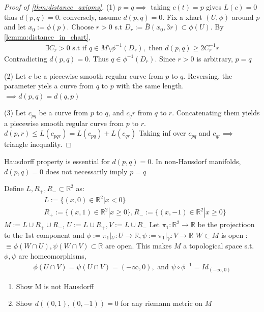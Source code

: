 \begin{proof}[Proof of \autoref{thm:distance_axioms}]
    (1) $p=q \implies$ taking $c(t) = p$ gives $L(c) = 0 $ thus $d(p,q) =0$.
    conversely, assume $d(p,q) = 0$.
    Fix a xhart $(U, \phi)$ around $p$ and let $x_0 := \phi(p)$. 
    Choose $r>0$ s.t $D_r := \bar{B}(x_0, 3r) \subset \phi(U)$. By \autoref{lemma:distance_in_chart}, 
    \[
    \begin{aligned}
        \exists C_r > 0 \text{ s.t if } q \in M \setminus \phi^{-1} (D_r), \text{ then } d(p,q) \geq 2C_r^{-1} r
    \end{aligned}
    \]
    Contradicting $d(p,q) = 0$. Thus $q \in \phi^{-1}(D_r)$.
    Since $r>0$ is arbitrary, $p=q$

    (2) Let $c$ be a piecewise smooth regular curve from $p$ to $q$. Reversing, the parameter yiels a curve from $q$ to $p$ with the same length. $\implies d(p,q) = d(q,p)$

    (3) Let $c_{pq}$ be a curve from $p$ to $q$, and $c_qr$ from $q$ to $r$. Concatenating them yields a piecewise smooth regular curve from $p$ to $r$.
    $d(p,r) \leq L(c_{pqr}) = L(c_{pq}) + L(c_{qr})$ Taking inf over $c_{pq}$ and $c_{qr} \implies$ triangle inequality. 
\end{proof}

\begin{remark}
    Hausdorff property is essential for $d(p,q) = 0$. In non-Hausdorf manifolds, $d(p,q)=0$ does not necessarily imply $p=q$
\end{remark}

\begin{problem}
    Define $L, R_+, R_- \subset \mathbb{R}^2$ as:
    \[
    \begin{aligned}
        &L:= \{(x, 0) \in \mathbb{R}^2 | x<0\}\\
        &R_+ := \{(x, 1) \in \mathbb{R}^2 | x \geq 0\}, R_- := \{(x, -1) \in \mathbb{R}^2 | x \geq 0\}
    \end{aligned}
    \]
    $M:=L \cup R_+ \cup R_-$, $U:= L \cup R_+, V:= L \cup R_-$
    Let $\pi_1 : \mathbb{R}^2 \to \mathbb{R}$ be the projectioon to the 1st component
    and $\phi := \pi_1 |_U : U \to \mathbb{R}, \psi := \pi_1 |_V : V \to \mathbb{R}$
    $W \subset M$ is open : $\equiv \phi(W \cap U), \psi(W \cap  V)\subset \mathbb{R}$ are open.
    This makes $M$ a topological space s.t. $\phi, \psi$ are homeomorphisms,
    \[
    \begin{aligned}
        \phi(U \cap V) = \psi(U\cap V) = (-\infty, 0), \text{ and } \psi \circ \phi^{-1} = Id_{(-\infty, 0)}
    \end{aligned}
    \]
    \begin{enumerate}
        \item Show M is not Hausdorff
        \item Show $d \left((0,1), (0,-1)\right) = 0$ for any riemann metric on $M$
    \end{enumerate}
\end{problem}

